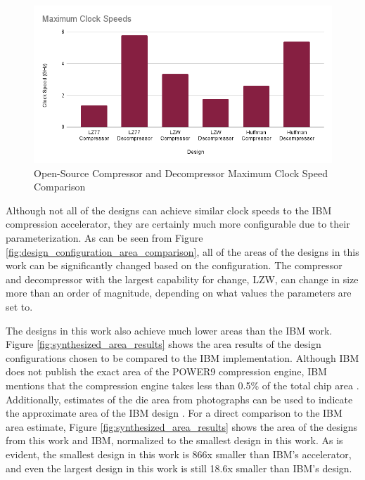 \documentclass[doublespace,nopageskip]{VTthesis}
\begin{document}
\begin{figure}[htb]
	\centering
	\includegraphics[scale=0.6]{Maximum Clock Speeds.png}
	\caption{Open-Source Compressor and Decompressor Maximum Clock Speed Comparison}
	\label{fig:maximum_clock_speeds}
\end{figure}

Although not all of the designs can achieve similar clock speeds to the IBM compression accelerator, they are certainly much more configurable due to their parameterization. As can be seen from Figure \ref{fig:design_configuration_area_comparison}, all of the areas of the designs in this work can be significantly changed based on the configuration. The compressor and decompressor with the largest capability for change, LZW, can change in size more than an order of magnitude, depending on what values the parameters are set to.

The designs in this work also achieve much lower areas than the IBM work. Figure \ref{fig:synthesized_area_results} shows the area results of the design configurations chosen to be compared to the IBM implementation. Although IBM does not publish the exact area of the POWER9 compression engine, IBM mentions that the compression engine takes less than 0.5\% of the total chip area \cite{ibm}. Additionally, estimates of the die area from photographs can be used to indicate the approximate area of the IBM design \cite{wikichip-ibm-area}. For a direct comparison to the IBM area estimate, Figure \ref{fig:synthesized_area_results} shows the area of the designs from this work and IBM, normalized to the smallest design in this work. As is evident, the smallest design in this work is 866x smaller than IBM's accelerator, and even the largest design in this work is still 18.6x smaller than IBM's design. 
\end{document}
